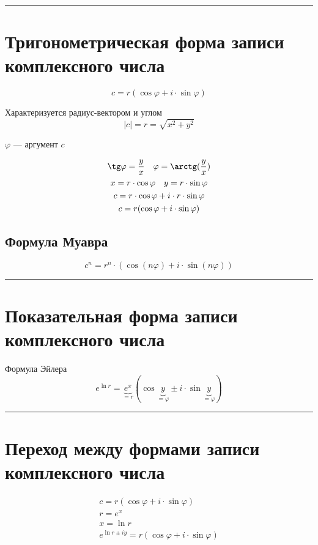 \documentclass{article}
\begin{document}
\par\noindent\rule{\textwidth}{1pt}
\section{Тригонометрическая форма записи комплексного числа}
\[
    c = r(\cos \varphi + i \cdot \sin \varphi)
\]

Характеризуется радиус-вектором и углом
\[
    |c| = r = \sqrt{x^2 + y^2}
\]

$\varphi$ --- аргумент $c$

\begin{gather*}
    \tg \varphi = \frac{y}{x} ~~~ \varphi = \arctg (\frac{y}{x}) \\
    x = r \cdot \cos \varphi ~~~ y = r \cdot \sin \varphi \\
    c = r \cdot \cos \varphi + i \cdot r \cdot \sin \varphi \\
    c = r(\cos \varphi + i \cdot \sin \varphi)
\end{gather*}


\subsection{Формула Муавра}
\[
    c^n = r^n \cdot (\cos(n \varphi) + i \cdot \sin(n \varphi))
\]



\par\noindent\rule{\textwidth}{1pt}
\section{Показательная форма записи комплексного числа}
Формула Эйлера
\[
    e^{\ln r} = \underbrace{e^x}_{= r} (\cos \underbrace{y}_{= \varphi} \pm i \cdot \sin \underbrace{y}_{= \varphi})
\]



\par\noindent\rule{\textwidth}{1pt}
\section{Переход между формами записи комплексного числа}
\begin{gather*}
    c = r(\cos \varphi + i \cdot \sin \varphi) \\
    r = e^x \\
    x = \ln r \\
    e^{\ln r \pm iy} = r(\cos \varphi + i \cdot \sin \varphi)
\end{gather*}
\end{document}
